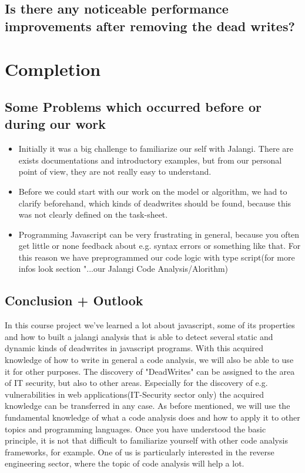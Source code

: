 \documentclass[a4paper]{scrartcl}
\begin{document}
\subsection{Is there any noticeable performance improvements after removing the dead writes?}
\newpage
\section{Completion}
\subsection{Some Problems which occurred before or during our work}
\begin{itemize}
\item Initially it was a big challenge to familiarize our self with Jalangi. There are exists documentations and introductory examples, but from our personal point of view, they are not really easy to understand.
\item Before we could start with our work on the model or algorithm, we had to clarify beforehand, which kinds of deadwrites should be found, because this was not clearly defined on the task-sheet.
\item Programming Javascript can be very frustrating in general, because you often get little or none feedback about e.g. syntax errors or something like that.  For this reason we have preprogrammed our code logic with type script(for more infos look section "...our Jalangi Code Analysis/Alorithm)
\end{itemize}
\subsection{Conclusion + Outlook}
In this course project we've learned a lot about javascript, some of its properties and how to built a jalangi analysis that is able to detect several static and dynamic kinds of deadwrites in javascript programs. With this acquired knowledge of how to write in general a code analysis, we will also be able to use it for other purposes. The discovery of "DeadWrites" can be assigned to the area of IT security, but also to other areas. Especially for the discovery of e.g. vulnerabilities in web applications(IT-Security sector only) the acquired knowledge can be transferred in any case. As before mentioned, we will use the fundamental knowledge of what a code analysis does and how to apply it to other topics and programming languages. Once you have understood the basic principle, it is not that difficult to familiarize yourself with other code analysis frameworks, for example. One of us is particularly interested in the reverse engineering sector, where the topic of code analysis will help a lot.
\end{document}
